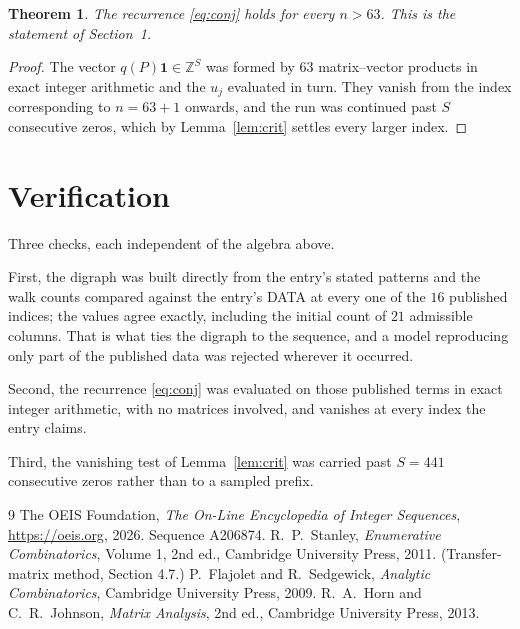 \documentclass[11pt,a4paper]{article}
\theoremstyle{plain}
\newtheorem{theorem}{Theorem}
\theoremstyle{definition}
\begin{document}
\begin{theorem}
The recurrence \eqref{eq:conj} holds for every $n>63$. This is the statement of
Section~1.
\end{theorem}

\begin{proof}
The vector $q(P)\mathbf{1}\in\mathbb{Z}^{S}$ was formed by $63$ matrix--vector
products in exact integer arithmetic and the $u_j$ evaluated in turn. They vanish from the
index corresponding to $n=63+1$ onwards, and the run was continued past $S$ consecutive
zeros, which by Lemma~\ref{lem:crit} settles every larger index.
\end{proof}

\section{Verification}

Three checks, each independent of the algebra above.

First, the digraph was built directly from the entry's stated patterns and the walk counts
compared against the entry's DATA at every one of the $16$ published indices; the
values agree exactly, including the initial count of $21$ admissible columns. That is
what ties the digraph to the sequence, and a model reproducing only part of the published
data was rejected wherever it occurred.

Second, the recurrence \eqref{eq:conj} was evaluated on those published terms in exact
integer arithmetic, with no matrices involved, and vanishes at every index the entry claims.

Third, the vanishing test of Lemma~\ref{lem:crit} was carried past $S=441$ consecutive
zeros rather than to a sampled prefix.

\begin{thebibliography}{9}
 The OEIS Foundation, \emph{The On-Line Encyclopedia of Integer
Sequences}, \url{https://oeis.org}, 2026. Sequence A206874.
 R.~P.~Stanley, \emph{Enumerative Combinatorics}, Volume 1, 2nd ed.,
Cambridge University Press, 2011. (Transfer-matrix method, Section 4.7.)
 P.~Flajolet and R.~Sedgewick, \emph{Analytic Combinatorics}, Cambridge
University Press, 2009.
 R.~A.~Horn and C.~R.~Johnson, \emph{Matrix Analysis}, 2nd ed., Cambridge
University Press, 2013.
\end{thebibliography}
\end{document}
